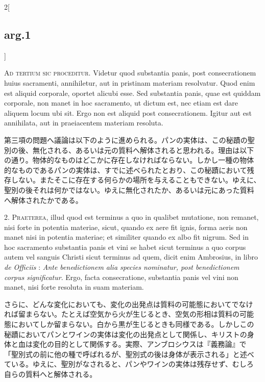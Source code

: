 \documentclass[paper=a4paper,fontsize=10pt,jafontsize=9pt,titlepage]{jlreq}
\begin{document}
\begin{paracol}{2}[\subsection{arg.1}]

{\scshape Ad tertium sic proceditur}. Videtur quod substantia panis,
post consecrationem huius sacramenti, annihiletur, aut in pristinam
materiam resolvatur. Quod enim est aliquid corporale, oportet alicubi
esse. Sed substantia panis, quae est quiddam corporale, non manet in
hoc sacramento, ut dictum est, nec etiam est dare aliquem locum ubi
sit. Ergo non est aliquid post consecrationem. Igitur aut est
annihilata, aut in praeiacentem materiam resoluta.

\switchcolumn

第三項の問題へ議論は以下のように進められる。パンの実体は、この秘蹟の聖
別の後、無化される、あるいは元の質料へ解体されると思われる。理由は以下
の通り。物体的なものはどこかに存在しなければならない。しかし一種の物体
的なものであるパンの実体は、すでに述べられたとおり、この秘蹟において残
存しない。またそこに存在する何らかの場所を与えることもできない。ゆえに、
聖別の後それは何かではない。ゆえに無化されたか、あるいは元にあった質料
へ解体されたかである。


2. {\scshape Praeterea}, illud quod est terminus a quo in qualibet
mutatione, non remanet, nisi forte in potentia materiae, sicut, quando
ex aere fit ignis, forma aeris non manet nisi in potentia materiae; et
similiter quando ex albo fit nigrum. Sed in hoc sacramento substantia
panis et vini se habet sicut terminus a quo corpus autem vel sanguis
Christi sicut terminus ad quem, dicit enim Ambrosius, in libro
{\itshape de Officiis} : {\itshape Ante benedictionem alia species
nominatur, post benedictionem corpus significatur}. Ergo, facta
consecratione, substantia panis vel vini non manet, nisi forte
resoluta in suam materiam.

\switchcolumn

さらに、どんな変化においても、変化の出発点は質料の可能態においてでなけ
れば留まらない。たとえば空気から火が生じるとき、空気の形相は質料の可能
態においてしか留まらない。白から黒が生じるときも同様である。しかしこの
秘蹟においてパンとワインの実体は変化の出発点として関係し、キリストの身
体と血は変化の目的として関係する。実際、アンブロシウスは『義務論』で
「聖別式の前に他の種で呼ばれるが、聖別式の後は身体が表示される」と述べ
ている。ゆえに、聖別がなされると、パンやワインの実体は残存せず、むしろ
自らの質料へと解体される。


\end{paracol}
\end{document}
